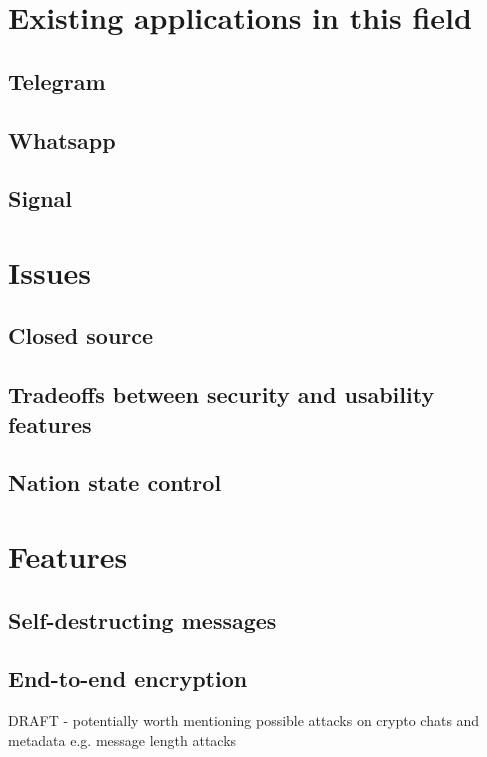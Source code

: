 \documentclass{mproj}
\begin{document}
\section{Existing applications in this field}

\subsection{Telegram}

\subsection{Whatsapp}

\subsection{Signal}

\section{Issues}

\subsection{Closed source}

\subsection{Tradeoffs between security and usability features}

\subsection{Nation state control}


\section{Features}
\subsection{Self-destructing messages}
\subsection{End-to-end encryption}

DRAFT - potentially worth mentioning possible attacks on crypto chats and metadata e.g. message length attacks \cite{degabriele2021hiding}
\end{document}

